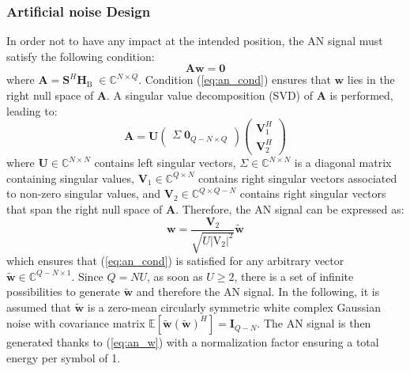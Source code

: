 \documentclass[12pt, draftclsnofoot, onecolumn]{IEEEtran}
\newcommand{\EX}[1]{\mathbb{E} \left[#1\right]}%
\newcommand{\HB}{\textbf{H}_{\text{B}}}
\newcommand{\spread}{\textbf{S}}
\newcommand{\w}{\textbf{w}}
\newcommand{\mat}[1]{\boldsymbol{\mathrm{#1}}}
\newcommand{\C}{\mathbb{C}}
\begin{document}
\subsubsection{Artificial noise Design}\label{sec:artificial-noise-design}
In order not to have any impact at the intended position, the AN signal must satisfy the following condition:
\begin{equation}
	\textbf{A} \w \; = \; \textbf{0}
	\label{eq:an_cond}
\end{equation}
where $\textbf{A} = \spread^H\HB\; \in \C^{N\times Q}$. Condition (\ref{eq:an_cond}) ensures that $\w$ lies in the right null space of $\textbf{A}$. A singular value decomposition (SVD) of $\textbf{A}$ is performed, leading to:
\begin{equation}
	\textbf{A} = \textbf{U} 
	\begin{pmatrix}
		\Sigma \; \textbf{0}_{Q-N\times Q}
	\end{pmatrix}
	\begin{pmatrix}
		\textbf{V}_1^H \\
		\textbf{V}_2^H
	\end{pmatrix}
	\label{eq:an_svd}
\end{equation}
where $\textbf{U} \in \C^{N \times N}$ contains left singular vectors, $\Sigma \in \C^{N \times N}$ is a diagonal matrix containing singular values, $\textbf{V}_1 \in \C^{Q \times N}$ contains right singular vectors associated to non-zero singular values, and $\textbf{V}_2 \in \C^{Q \times Q-N}$ contains right singular vectors that span the right null space of $\textbf{A}$. Therefore, the AN signal can be expressed as:
\begin{equation}
	\w = \frac{\textbf{V}_2}{\sqrt{U |\mat{V_2}|^2}} \tilde{\w}
	\label{eq:an_w}
\end{equation}
which ensures that (\ref{eq:an_cond}) is satisfied for any arbitrary vector $\tilde{\w} \in \C^{Q-N \times 1}$. Since $Q = NU$, as soon as $U\geq 2$, there is a set of infinite possibilities to generate $\tilde{\w}$ and therefore the AN signal. In the following, it is assumed that $\tilde{\w}$ is a zero-mean circularly symmetric white complex Gaussian noise with covariance matrix $\EX{\tilde{\w}(\tilde{\w})^H} = \textbf{I}_{Q-N }$. The AN signal is then generated thanks to (\ref{eq:an_w}) with a normalization factor ensuring a total energy per symbol of 1.
\end{document}
